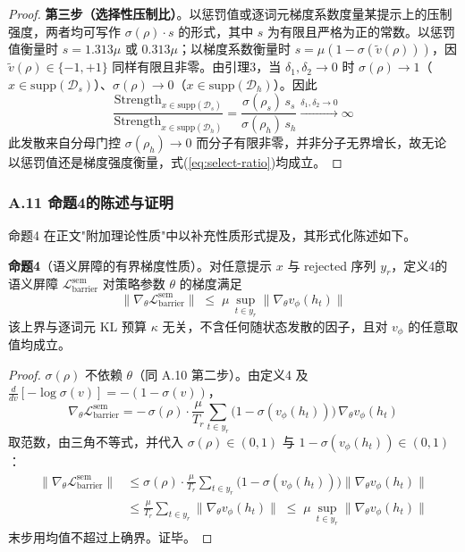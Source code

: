 \documentclass[lettersize,journal]{IEEEtran}
\begin{document}
\begin{proof}
\textbf{第三步（选择性压制比）}。以惩罚值或逐词元梯度系数度量某提示上的压制强度，两者均可写作 $\sigma(\rho)\cdot s$ 的形式，其中 $s$ 为有限且严格为正的常数。以惩罚值衡量时 $s = 1.313\mu$ 或 $0.313\mu$；以梯度系数衡量时 $s = \mu(1-\sigma(\tilde{v}(\rho)))$，因 $\tilde{v}(\rho) \in \{-1, +1\}$ 同样有限且非零。由引理3，当 $\delta_1, \delta_2 \to 0$ 时 $\sigma(\rho) \to 1$（$x \in \mathrm{supp}(\mathcal{D}_s)$）、$\sigma(\rho) \to 0$（$x \in \mathrm{supp}(\mathcal{D}_h)$）。因此
\begin{equation}
\frac{\text{Strength}_{x \in \mathrm{supp}(\mathcal{D}_s)}}
{\text{Strength}_{x \in \mathrm{supp}(\mathcal{D}_h)}}
= \frac{\sigma(\rho_s)\,s_s}{\sigma(\rho_h)\,s_h}
\xrightarrow[]{\delta_1, \delta_2 \to 0} \infty
\end{equation}
此发散来自分母门控 $\sigma(\rho_h) \to 0$ 而分子有限非零，并非分子无界增长，故无论以惩罚值还是梯度强度衡量，式(\ref{eq:select-ratio})均成立。
\end{proof}

\subsubsection*{A.11 命题4的陈述与证明}\label{app:bdgrad}

命题4 在正文"附加理论性质"中以补充性质形式提及，其形式化陈述如下。

\textbf{命题4}（语义屏障的有界梯度性质）。对任意提示 $x$ 与 rejected 序列 $y_r$，定义4的语义屏障 $\mathcal{L}^{\text{sem}}_{\text{barrier}}$ 对策略参数 $\theta$ 的梯度满足
\begin{equation}\label{eq:bdgrad}
\bigl\|\nabla_\theta\mathcal{L}^{\text{sem}}_{\text{barrier}}\bigr\|
\;\leq\; \mu\,\sup_{t \in y_r}\bigl\|\nabla_\theta v_\phi(h_t)\bigr\|
\end{equation}
该上界与逐词元 KL 预算 $\kappa$ 无关，不含任何随状态发散的因子，且对 $v_\phi$ 的任意取值均成立。

\begin{proof}
$\sigma(\rho)$ 不依赖 $\theta$（同 A.10 第二步）。由定义4 及 $\frac{d}{dv}[-\log\sigma(v)] = -(1-\sigma(v))$，
\begin{equation}
\nabla_\theta\mathcal{L}^{\text{sem}}_{\text{barrier}}
= -\,\sigma(\rho)\cdot\frac{\mu}{T_r}\sum_{t \in y_r}
\bigl(1-\sigma(v_\phi(h_t))\bigr)\,\nabla_\theta v_\phi(h_t)
\end{equation}
取范数，由三角不等式，并代入 $\sigma(\rho) \in (0, 1)$ 与 $1-\sigma(v_\phi(h_t)) \in (0, 1)$：
\begin{equation}
\begin{aligned}
\bigl\|\nabla_\theta\mathcal{L}^{\text{sem}}_{\text{barrier}}\bigr\|
&\leq \sigma(\rho)\cdot\frac{\mu}{T_r}\sum_{t \in y_r}
\bigl(1-\sigma(v_\phi(h_t))\bigr)\bigl\|\nabla_\theta v_\phi(h_t)\bigr\| \\
&\leq \frac{\mu}{T_r}\sum_{t \in y_r}\bigl\|\nabla_\theta v_\phi(h_t)\bigr\|
\;\leq\; \mu\,\sup_{t \in y_r}\bigl\|\nabla_\theta v_\phi(h_t)\bigr\|
\end{aligned}
\end{equation}
末步用均值不超过上确界。证毕。
\end{proof}
\end{document}
